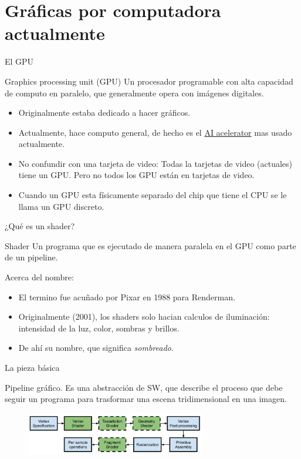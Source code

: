 \section{Gráficas por computadora actualmente}

\begin{frame}{El GPU}
\begin{block}{Graphics processing unit (GPU)}
    Un procesador programable con alta capacidad de computo en paralelo, que generalmente opera con imágenes digitales.
\end{block}
    \begin{itemize}
        \item Originalmente estaba dedicado a hacer gráficos.
        \item Actualmente, hace computo general, de hecho es el \href{https://en.wikipedia.org/wiki/AI_accelerator}{AI acelerator} mas usado actualmente.
        \item No confundir con una tarjeta de video: Todas la tarjetas de video (actuales) tiene un GPU. Pero no todos los GPU están en tarjetas de video.
        \item Cuando un GPU esta físicamente separado del chip que tiene el CPU se le llama un GPU discreto.
     \end{itemize}
\end{frame}

\begin{frame}{¿Qué es un shader?}
\begin{block}{Shader}
    Un programa que es ejecutado de manera paralela en el GPU como parte de un pipeline.
\end{block}
Acerca del nombre:
    \begin{itemize}
        \item El termino fue acuñado por Pixar en 1988 para Renderman.
        \item Originalmente (2001), los shaders solo hacian calculos de iluminación: intensidad de la luz, color, sombras y brillos.
        \item De ahí su nombre, que significa \emph{sombreado}.
     \end{itemize}

\end{frame}

\begin{frame}{La pieza básica}
\begin{block}{Pipeline gráfico.}
    Es una abstracción de SW, que describe el proceso que debe seguir un programa para trasformar una escena tridimensional en una imagen.
\end{block}
\begin{figure}[htb]
  \centering
  \includegraphics[width=0.7\textwidth]{img/RenderPipeline}
\end{figure} 
\end{frame}

